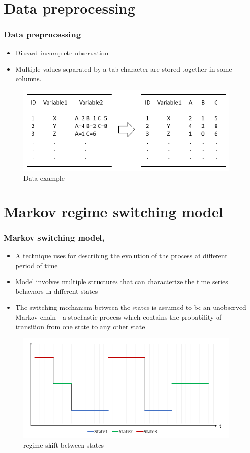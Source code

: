 \documentclass{beamer}
\begin{document}
\section{Data preprocessing}
\begin{frame}
\frametitle{Data preprocessing}
\begin{itemize}
	\item Discard incomplete observation
	\item Multiple values separated by a tab character are stored together in some columns.
	
\end{itemize}

\begin{figure}
	\includegraphics[width=0.6\linewidth]{table4}
	\caption{Data example}
\end{figure}

\end{frame}


\section{Markov regime switching model} %
\begin{frame}
	\frametitle{Markov switching model, \cite{p1}}
	\begin{itemize}
		\item A technique uses for describing the evolution of the process at different period of time
		\item Model involves multiple structures that can characterize the time series behaviors in different states
		\item The switching mechanism between the states is assumed to be an unobserved Markov chain - \footnotesize{a stochastic process which contains the probability of transition from one state to any other state}
	\end{itemize}

\begin{figure}
	\includegraphics[width=0.5\linewidth]{graph3}
	\caption{regime shift between states}
\end{figure}

\end{frame}
\end{document}
